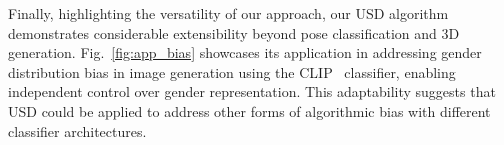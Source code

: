 Finally, highlighting the versatility of our approach, our USD algorithm demonstrates considerable extensibility beyond pose classification and 3D generation. Fig.~\ref{fig:app_bias} showcases its application in addressing gender distribution bias in image generation using the CLIP~\citep{radford2021learning} classifier, enabling independent control over gender representation. This adaptability suggests that USD could be applied to address other forms of algorithmic bias with different classifier architectures.





